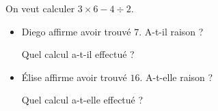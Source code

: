 \documentclass[a4paper,11pt]{article}
\begin{document}
\begin{minipage}[t][0.45\textheight][t]{\textwidth}

	\begin{exercice}[(2 points)]
		On veut calculer $3 × 6 - 4 ÷ 2$.
		\begin{itemize}
			\item Diego affirme avoir trouvé $7$. A-t-il raison ?

			      Quel calcul a-t-il effectué ? \vspace{3cm}
			\item Élise affirme avoir trouvé $16$. A-t-elle raison ?

			      Quel calcul a-t-elle effectué ?\vspace{3cm}
		\end{itemize}
	\end{exercice}

\end{minipage}
\end{document}
